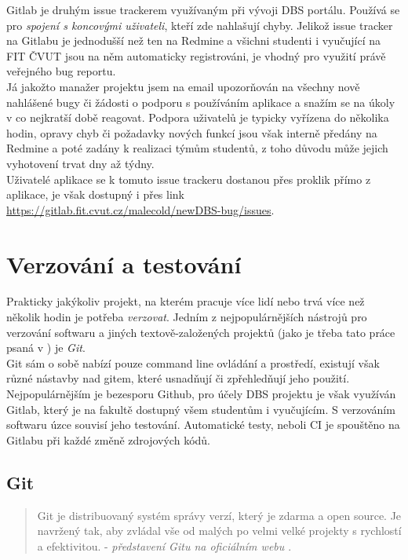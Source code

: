 Gitlab je druhým issue trackerem využívaným při vývoji DBS portálu. Používá se pro \emph{spojení s koncovými uživateli}, kteří zde nahlašují chyby. Jelikož issue tracker na Gitlabu je jednodušší než ten na Redmine a všichni studenti i vyučující na FIT ČVUT jsou na něm automaticky registrováni, je vhodný pro využití právě veřejného bug reportu.\\
Já jakožto manažer projektu jsem na email upozorňován na všechny nově nahlášené bugy či žádosti o podporu s používáním aplikace a snažím se na úkoly v co nejkratší době reagovat. Podpora uživatelů je typicky vyřízena do několika hodin, opravy chyb či požadavky nových funkcí jsou však interně předány na Redmine a poté zadány k realizaci týmům studentů, z toho důvodu může jejich vyhotovení trvat dny až týdny.\\
Uživatelé aplikace se k tomuto issue trackeru dostanou přes proklik přímo z aplikace, je však dostupný i přes link \url{https://gitlab.fit.cvut.cz/malecold/newDBS-bug/issues}.


\section{Verzování a testování}

Prakticky jakýkoliv projekt, na kterém pracuje více lidí nebo trvá více než několik hodin je potřeba \emph{verzovat}. Jedním z nejpopulárnějších nástrojů pro verzování softwaru a jiných textově-založených projektů (jako je třeba tato práce psaná v \XeLaTeX) je \emph{Git}.\\
Git sám o sobě nabízí pouze command line ovládání a prostředí, existují však různé nástavby nad gitem, které usnadňují či zpřehledňují jeho použití. Nejpopulárnějším je bezesporu Github, pro účely DBS projektu je však využíván Gitlab, který je na fakultě dostupný všem studentům i vyučujícím.
S verzováním softwaru úzce souvisí jeho testování. Automatické testy, neboli CI je spouštěno na Gitlabu při každé změně zdrojových kódů.

\subsection{Git} \label{version:git}

\begin{quote}
Git je distribuovaný systém správy verzí, který je zdarma a open source. Je navržený tak, aby zvládal vše od malých po velmi velké projekty s rychlostí a efektivitou. - \emph{představení Gitu na oficiálním webu \cite{git}}.
\end{quote}

